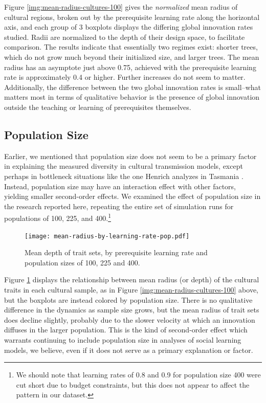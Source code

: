 \documentclass[graybox,natbib]{svmult}
\begin{document}
Figure \ref{img:mean-radius-cultures-100} gives the \emph{normalized}
mean radius of cultural regions, broken out by the prerequisite learning
rate along the horizontal axis, and each group of 3 boxplots displays
the differing global innovation rates studied. Radii are normalized to
the depth of their design space, to facilitate comparison. The results
indicate that essentially two regimes exist: shorter trees, which do not
grow much beyond their initialized size, and larger trees. The mean
radius has an asymptote just above 0.75, achieved with the prerequisite
learning rate is approximately 0.4 or higher. Further increases do not
seem to matter. Additionally, the difference between the two global
innovation rates is small--what matters most in terms of qualitative
behavior is the presence of global innovation outside the teaching or
learning of prerequisites themselves.

\subsection{Population Size}\label{population-size}

Earlier, we mentioned that population size does not seem to be a primary
factor in explaining the measured diversity in cultural transmission
models, except perhaps in bottleneck situations like the one Henrich
analyzes in Tasmania \citeyearpar{henrich2004}. Instead, population size
may have an interaction effect with other factors, yielding smaller
second-order effects. We examined the effect of population size in the
research reported here, repeating the entire set of simulation runs for
populations of 100, 225, and 400.\footnote{We should note that learning
  rates of 0.8 and 0.9 for population size 400 were cut short due to
  budget constraints, but this does not appear to affect the pattern in
  our dataset.}

\begin{figure}[h] 
\centering 
\texttt{[image: mean-radius-by-learning-rate-pop.pdf]} 
\caption{Mean depth of trait sets, by prerequisite learning rate and population sizes of 100, 225 and 400.} 
\label{img:mean-radius-cultures-pop} 
\end{figure}

Figure \ref{img:mean-radius-cultures-pop} displays the relationship
between mean radius (or depth) of the cultural traits in each cultural
sample, as in Figure \ref{img:mean-radius-cultures-100} above, but the
boxplots are instead colored by population size. There is no qualitative
difference in the dynamics as sample size grows, but the mean radius of
trait sets does decline slightly, probably due to the slower velocity at
which an innovation diffuses in the larger population. This is the kind
of second-order effect which warrants continuing to include population
size in analyses of social learning models, we believe, even if it does
not serve as a primary explanation or factor.
\end{document}
